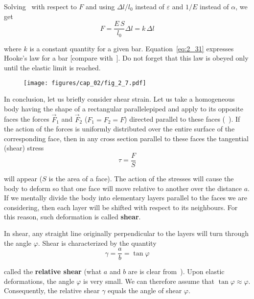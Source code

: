 Solving~ with respect to $F$ and using $\Delta l/l_0$ instead of $\varepsilon$ and $1/E$ instead of $\alpha$, we get
\begin{equation}\label{eq:2_31}
F = \frac{E\,S}{l_0}\Delta l = k\,\Delta l
\end{equation}

\noindent
where $k$ is a constant quantity for a given bar. Equation~\eqref{eq:2_31} expresses Hooke's law for a bar [compare with~]. Do not forget that this law is obeyed only until the elastic limit is reached. 

\begin{figure}[t]
	\begin{center}
		\texttt{[image: figures/cap\_02/fig\_2\_7.pdf]}
		\caption[]{}
		\label{fig:2_7}
	\end{center}
	\vspace{-0.7cm}
\end{figure}

In conclusion, let us briefly consider shear strain. Let us take a homogeneous body having the shape of a rectangular parallelepiped and apply to its opposite faces the forces $\vec{F}_1$ and $\vec{F}_2$ ($F_1=F_2=F$) directed parallel to these faces (~). If the action of the forces is uniformly distributed over the entire surface of the corresponding face, then in any cross section parallel to these faces the tangential (shear) stress
\begin{equation}\label{eq:2_32}
\tau = \frac{F}{S}
\end{equation}

\noindent
will appear ($S$ is the area of a face). The action of the stresses will cause the body to deform so that one face will move relative to another over the distance $a$. If we mentally divide the body into elementary layers parallel to the faces we are considering, then each layer will be shifted with respect to its neighbours. For this reason, such deformation is called \textbf{shear}.

In shear, any straight line originally perpendicular to the layers will turn through the angle $\varphi$. Shear is characterized by the quantity
\begin{equation}\label{eq:2_33}
\gamma = \frac{a}{b} = \tan\varphi
\end{equation}

\noindent
called the \textbf{relative shear} (what $a$ and $b$ are is clear from~). Upon elastic deformations, the angle $\varphi$ is very small. We can therefore assume that $\tan\varphi\approx\varphi$. Consequently, the relative shear $\gamma$ equals the angle of shear $\varphi$.

